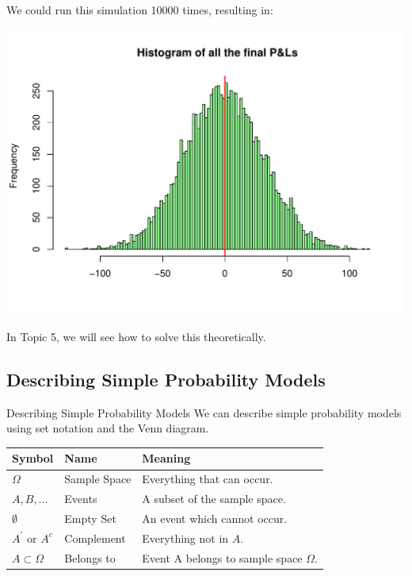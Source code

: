 \documentclass[t,xcolor=pdftex,dvipsnames,table]{beamer}
\makeatletter
\def\maxwidth{ %
  \ifdim\Gin@nat@width>\linewidth
    \linewidth
  \else
    \Gin@nat@width
  \fi
}
\newenvironment{knitrout}{}{} %
\makeatother
\begin{document}
\begin{frame}{}
We could run this simulation 10000 times, resulting in:

\begin{knitrout}
\color{fgcolor}
\includegraphics[width=\maxwidth]{figure/unnamed-chunk-4-1} 

\end{knitrout}

In Topic 5, we will see how to solve this theoretically.

\end{frame}


\subsection[]{Describing Simple Probability Models}

\begin{frame}[fragile]{Describing Simple Probability Models}
We can describe simple probability models using set notation and the Venn diagram.

\vspace{.5cm}
\begin{tabular}{lll}
Symbol & Name & Meaning \\ \hline
$\Omega$ & Sample Space & Everything that can occur. \\
$A, B, \ldots$ & Events & A subset of the sample space. \\ $\emptyset$  & Empty Set & An event which cannot occur. \\
 $A^{'}$ or $A^c$ & Complement & Everything not in $A$. \\
$A \subset \Omega$  & Belongs to & Event A belongs to sample space $\Omega$. \\
\end{tabular}

\begin{center}
\end{center}

\end{frame}
\end{document}
